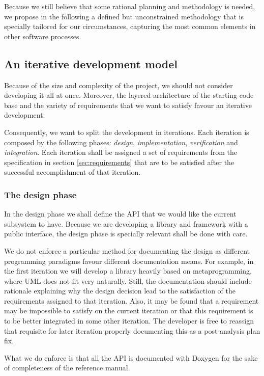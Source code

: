 Because we still believe that some rational planning and methodology
is needed, we propose in the following a defined but unconstrained
methodology that is specially tailored for our circumstances,
capturing the most common elements in other software processes.

\subsection{An iterative development model}

Because of the size and complexity of the project, we should not
consider developing it all at once. Moreover, the layered architecture
of the starting code base and the variety of requirements that we want
to satisfy favour an iterative development.

Consequently, we want to split the development in iterations. Each
iteration is composed by the following phases: \emph{design},
\emph{implementation}, \emph{verification} and
\emph{integration}. Each iteration shall be assigned a set of
requirements from the specification in section \ref{sec:requirements}
that are to be satisfied after the successful accomplishment of that
iteration.

\subsubsection{The design phase}

In the design phase we shall define the API that we
would like the current subsystem to have. Because we are developing a
library and framework with a public interface, the design phase is
specially relevant shall be done with care.

We do not enforce a particular method for documenting the design as
different programming paradigms favour different documentation
means. For example, in the first iteration we will develop a library
heavily based on metaprogramming, where UML does not fit very
naturally. Still, the documentation should include rationale
explaining why the design decision lead to the satisfaction of the
requirements assigned to that iteration. Also, it may be found that a
requirement may be impossible to satisfy on the current iteration or
that this requirement is to be better integrated in some other
iteration. The developer is free to reassign that requisite for later
iteration properly documenting this as a post-analysis plan fix.

What we do enforce is that all the API is documented with Doxygen for
the sake of completeness of the reference manual.

